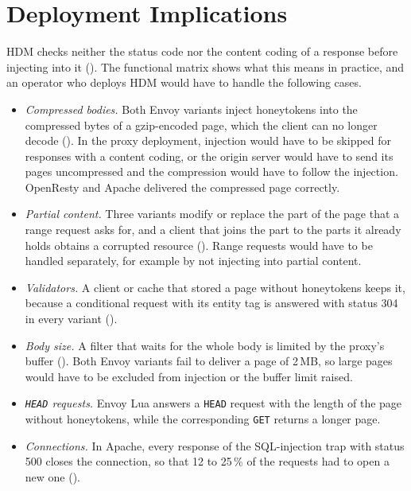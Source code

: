 \documentclass{rptuma}
\begin{document}
\section{Deployment Implications}
\label{sec:disc.deploy}

HDM checks neither the status code nor the content coding of a response before injecting into it
(). The functional matrix shows what this means in practice, and an
operator who deploys HDM would have to handle the following cases.
\begin{itemize}
  \item \emph{Compressed bodies.} Both Envoy variants inject honeytokens into the compressed bytes
    of a gzip-encoded page, which the client can no longer decode
    (). In the proxy deployment, injection would have to be skipped
    for responses with a content coding, or the origin server would have to send its pages
    uncompressed and the compression would have to follow the injection. OpenResty and Apache
    delivered the compressed page correctly.
  \item \emph{Partial content.} Three variants modify or replace the part of the page that a range
    request asks for, and a client that joins the part to the parts it already holds obtains a
    corrupted resource (). Range requests would have to be handled
    separately, for example by not injecting into partial content.
  \item \emph{Validators.} A client or cache that stored a page without honeytokens keeps it,
    because a conditional request with its entity tag is answered with status 304 in every variant
    ().
  \item \emph{Body size.} A filter that waits for the whole body is limited by the proxy's buffer
    (). Both Envoy variants fail to deliver a page of 2\,MB, so large
    pages would have to be excluded from injection or the buffer limit raised.
  \item \emph{\texttt{HEAD} requests.} Envoy Lua answers a \texttt{HEAD} request with the length of
    the page without honeytokens, while the corresponding \texttt{GET} returns a longer page.
  \item \emph{Connections.} In Apache, every response of the SQL-injection trap with status 500
    closes the connection, so that 12 to 25\,\% of the requests had to open a new one
    ().
\end{itemize}
\end{document}
